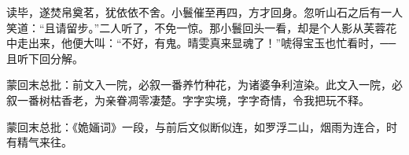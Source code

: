 \begin{parag}
    读毕，遂焚帛奠茗，犹依依不舍。小鬟催至再四，方才回身。忽听山石之后有一人笑道：“且请留步。”二人听了，不免一惊。那小鬟回头一看，却是个人影从芙蓉花中走出来，他便大叫：“不好，有鬼。晴雯真来显魂了！”唬得宝玉也忙看时，──且听下回分解。
\end{parag}


\begin{parag}
    \begin{note}蒙回末总批：前文入一院，必叙一番养竹种花，为诸婆争利渲染。此文入一院，必叙一番树枯香老，为亲眷凋零凄楚。字字实境，字字奇情，令我把玩不释。\end{note}
\end{parag}


\begin{parag}
    \begin{note}蒙回末总批：《姽婳词》一段，与前后文似断似连，如罗浮二山，烟雨为连合，时有精气来往。\end{note}
\end{parag}

